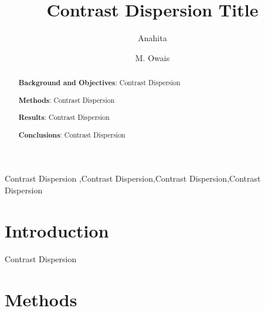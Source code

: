 \documentclass[times,twocolumn,final]{elsarticle}
\begin{document}

\begin{frontmatter}

\title{Contrast Dispersion Title }%


\author[1]{Anahita }

\author[2]{M. Owais }


\address[1]{Department of Electrical, Computer and Biomedical Engineering, Toronto Metropolitan University, 350 Victoria Street, Toronto, M5B 0A1, Canada}




\begin{abstract}
\textbf{Background and Objectives}: Contrast Dispersion

\textbf{Methods}: Contrast Dispersion 

\textbf{Results}: Contrast Dispersion

\textbf{Conclusions}: Contrast Dispersion
\end{abstract}


\begin{keyword}
\KWD Contrast Dispersion \sep Contrast Dispersion\sep Contrast Dispersion\sep Contrast Dispersion
\end{keyword}

\end{frontmatter}




\section{Introduction}
Contrast Dispersion
\section{Methods}
\end{document}
